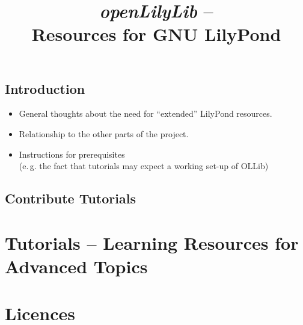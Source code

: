 \documentclass{OLLbook}
\begin{document}
\title{\textit{openLilyLib} -- \\
	Resources for GNU LilyPond}

\maketitle

\tableofcontents
\vfill
\pagebreak



\chapter{Introduction}

\begin{itemize}
\item General thoughts about the need for “extended” LilyPond resources.
\item Relationship to the other parts of the project.
\item Instructions for prerequisites\\
(e.\,g. the fact that tutorials may expect a working set-up of OLLib)
\end{itemize}

\chapter{Contribute Tutorials}



\part{Tutorials -- Learning Resources for Advanced Topics}



\part{Licences}

\end{document}

